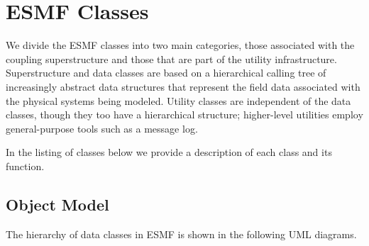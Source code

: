 \section{ESMF Classes}

We divide the ESMF classes into two main categories, those associated with the coupling 
superstructure and those that are part of the utility infrastructure.  Superstructure and data 
classes are based on a hierarchical 
calling tree of increasingly abstract data structures that represent the field data associated 
with the physical systems being modeled.  Utility classes are independent 
of the data classes, though they too have a hierarchical structure; higher-level utilities
employ general-purpose tools such as a message log.

In the listing of classes below we provide a description of each class and its function.

\subsection{Object Model}

The hierarchy of data classes in ESMF is shown in the following UML diagrams.  

